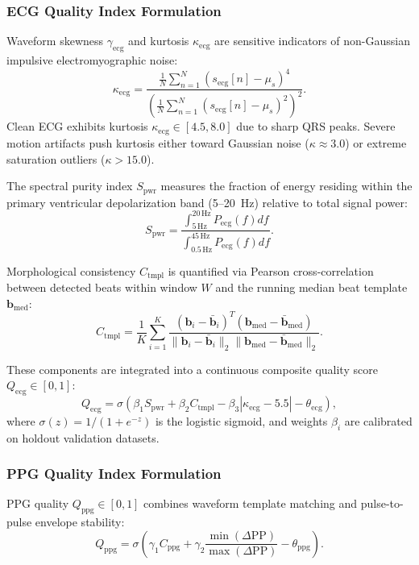 \documentclass{ieeeaccess}
\begin{document}
\subsubsection{ECG Quality Index Formulation}
Waveform skewness $\gamma_{\mathrm{ecg}}$ and kurtosis $\kappa_{\mathrm{ecg}}$ are sensitive indicators of non-Gaussian impulsive electromyographic noise:
\begin{equation}
\kappa_{\mathrm{ecg}} = \frac{\frac{1}{N}\sum_{n=1}^{N}(s_{\mathrm{ecg}}[n] - \mu_s)^4}{\left(\frac{1}{N}\sum_{n=1}^{N}(s_{\mathrm{ecg}}[n] - \mu_s)^2\right)^2}.
\end{equation}
Clean ECG exhibits kurtosis $\kappa_{\mathrm{ecg}} \in [4.5, 8.0]$ due to sharp QRS peaks. Severe motion artifacts push kurtosis either toward Gaussian noise ($\kappa \approx 3.0$) or extreme saturation outliers ($\kappa > 15.0$).

The spectral purity index $S_{\mathrm{pwr}}$ measures the fraction of energy residing within the primary ventricular depolarization band (5--20~Hz) relative to total signal power:
\begin{equation}
S_{\mathrm{pwr}} = \frac{\int_{5\,\mathrm{Hz}}^{20\,\mathrm{Hz}} P_{\mathrm{ecg}}(f) df}{\int_{0.5\,\mathrm{Hz}}^{45\,\mathrm{Hz}} P_{\mathrm{ecg}}(f) df}.
\end{equation}

Morphological consistency $C_{\mathrm{tmpl}}$ is quantified via Pearson cross-correlation between detected beats within window $W$ and the running median beat template $\mathbf{b}_{\mathrm{med}}$:
\begin{equation}
C_{\mathrm{tmpl}} = \frac{1}{K}\sum_{i=1}^{K} \frac{(\mathbf{b}_i - \bar{\mathbf{b}}_i)^T (\mathbf{b}_{\mathrm{med}} - \bar{\mathbf{b}}_{\mathrm{med}})}{\|\mathbf{b}_i - \bar{\mathbf{b}}_i\|_2 \|\mathbf{b}_{\mathrm{med}} - \bar{\mathbf{b}}_{\mathrm{med}}\|_2}.
\end{equation}

These components are integrated into a continuous composite quality score $Q_{\mathrm{ecg}} \in [0, 1]$:
\begin{equation}
Q_{\mathrm{ecg}} = \sigma\left( \beta_1 S_{\mathrm{pwr}} + \beta_2 C_{\mathrm{tmpl}} - \beta_3 |\kappa_{\mathrm{ecg}} - 5.5| - \theta_{\mathrm{ecg}} \right),
\end{equation}
where $\sigma(z) = 1 / (1 + e^{-z})$ is the logistic sigmoid, and weights $\beta_i$ are calibrated on holdout validation datasets.

\subsubsection{PPG Quality Index Formulation}
PPG quality $Q_{\mathrm{ppg}} \in [0, 1]$ combines waveform template matching and pulse-to-pulse envelope stability:
\begin{equation}
Q_{\mathrm{ppg}} = \sigma\left( \gamma_1 C_{\mathrm{ppg}} + \gamma_2 \frac{\min(\Delta \mathrm{PP})}{\max(\Delta \mathrm{PP})} - \theta_{\mathrm{ppg}} \right).
\end{equation}
\end{document}
